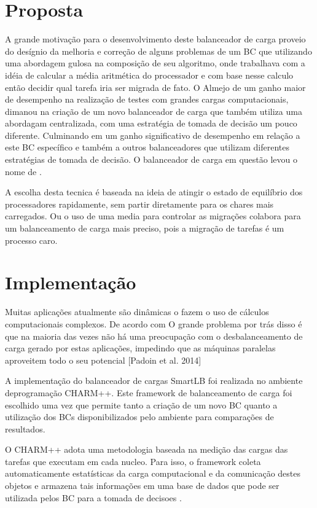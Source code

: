 \section{Proposta}
A grande motivação para o desenvolvimento deste balanceador de carga proveio do desígnio da melhoria e correção de alguns problemas de um BC que utilizando uma abordagem gulosa na composição de seu algoritmo, onde trabalhava com a idéia de calcular a média aritmética do processador e com base nesse calculo então decidir qual tarefa iria ser migrada de fato. O Almejo de um ganho maior de desempenho na realização de testes com grandes cargas computacionais, dimanou na criação de um novo balanceador de carga que também utiliza uma abordagam centralizada, com uma estratégia de tomada de decisão um pouco diferente. Culminando em um ganho significativo de desempenho em relação a este BC específico e também a outros balanceadores que utilizam diferentes estratégias de tomada de decisão. O balanceador de carga em questão levou o nome de \newlb.    

A escolha desta tecnica é baseada na ideia de atingir o estado de equilíbrio dos processadores rapidamente, sem partir diretamente para os chares mais carregados. Ou o uso de uma media para controlar as migrações colabora para um balanceamento de carga mais preciso, pois a migração de tarefas é um processo caro.

\section{Implementação}
Muitas aplicações atualmente são dinâmicas o fazem o uso de cálculos computacionais complexos. De acordo com \cite{} 
O grande problema por trás disso é que na maioria das vezes não há uma preocupação com o desbalanceamento de carga gerado por estas aplicações, impedindo que as máquinas paralelas aproveitem todo o seu potencial [Padoin et al. 2014]

A implementação do balanceador de cargas SmartLB foi realizada no ambiente deprogramação CHARM++. Este framework de balanceamento de carga foi escolhido uma vez que permite tanto a criação de um novo BC quanto a utilização dos BCs disponibilizados pelo ambiente para comparações de resultados. 

O CHARM++ adota uma metodologia baseada na medição das cargas das tarefas que executam em cada nucleo. Para isso, o framework coleta automaticamente estatísticas da carga computacional e da comunicação destes objetos e armazena tais informações em uma base de dados que pode ser utilizada pelos BC para a tomada de decisoes \cite{jyothi2004debugging}.

